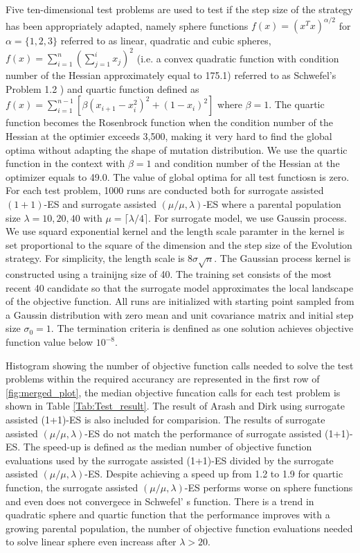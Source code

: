 Five ten-dimensional test problems are used to test if the step size of the strategy has been appropriately adapted, namely sphere functions $f(x) = (x^Tx)^{\alpha/2}$ for $\alpha = \{1,2,3 \}$ referred to as linear, quadratic and cubic spheres, $f(x) = \sum_{i=1}^n(\sum_{j=1}^i x_j)^2$ (i.e. a convex quadratic function with condition number of the Hessian approximately equal to 175.1) referred to as Schwefel's Problem 1.2 \cite{Schwefel:1981:NOC:539468}) and quartic function \cite{DBLP:conf/ppsn/KayhaniA18} defined as $f(x) = \sum_{i=1}^{n-1} \left[ \beta(x_{i+1} -x_i^2)^2 + (1-x_i)^2 \right]$ where $\beta = 1$. The quartic function becomes the Rosenbrock function when the condition number of the Hessian at the optimier exceeds 3,500, making it very hard to find the global optima without adapting the shape of mutation distribution. We use the quartic function in the context with $\beta=1$  and condition number of the Hessian at the optimizer equals to 49.0. The value of global optima for all test functiosn is zero. For each test problem, 1000 runs are conducted both for surrogate assisted $(1+1)$-ES and surrogate assisted $(\mu/\mu,\lambda)$-ES where a parental population size $\lambda=10,20,40$ with $\mu = \lceil \lambda / 4 \rceil$. For surrogate model, we use Gaussin process. We use squard exponential kernel and the length scale paramter in the kernel is set proportional to the square of the dimension and the step size of the Evolution strategy. For simplicity, the length scale is $8 \sigma \sqrt{n}$.
The Gaussian process kernel is constructed using a trainijng size of 40. The training set consists of the most recent 40 candidate so that the surrogate model approximates the local landscape of the objective function. All runs are initialized with starting point sampled from a Gaussin distribution with zero mean and unit covariance matrix and initial step size $\sigma_0=1$. The termination criteria is denfined as one solution achieves objective function value below $10^{-8}$.

Histogram showing the number of objective function calls needed to solve the test problems within the required accurancy are represented in the first row of \ref{fig:merged_plot}, the median objective funcation calls for each test problem is shown in Table \ref{Tab:Test_result}. The result of Arash and Dirk \cite{DBLP:conf/ppsn/KayhaniA18} using surrogate assisted (1+1)-ES is also included for comparision. The results of surrogate assisted $(\mu/\mu,\lambda)$-ES do not match the performance of surrogate assisted (1+1)-ES. The speed-up is defined as the median number of objective function evaluations used by the surrogate assisted (1+1)-ES \cite{DBLP:conf/ppsn/KayhaniA18} divided by the surrogate assisted $(\mu/\mu,\lambda)$-ES. Despite achieving a speed up from 1.2 to 1.9 for quartic function, the surrogate assisted $(\mu/\mu,\lambda)$-ES performs worse on sphere functions and even does not convergece in Schwefel' s function. There is a trend in quadratic sphere and quartic function that the performance improves with a growing parental population, the number of objective function evaluations needed to solve linear sphere even increass after $\lambda>20$. 

